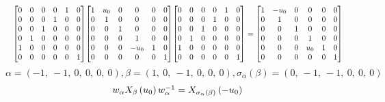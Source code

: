 \documentclass[11pt]{article}
\theoremstyle{definition}
\begin{document}
\[
\scaletoalign{\textwidth}{{\left[\begin{matrix}0 & 0 & 0 & 0 & 1 & 0\\0 & 0 & 0 & 1 & 0 & 0\\0 & 0 & 1 & 0 & 0 & 0\\0 & 1 & 0 & 0 & 0 & 0\\1 & 0 & 0 & 0 & 0 & 0\\0 & 0 & 0 & 0 & 0 & 1\end{matrix}\right]} {\left[\begin{matrix}1 & u_{0} & 0 & 0 & 0 & 0\\0 & 1 & 0 & 0 & 0 & 0\\0 & 0 & 1 & 0 & 0 & 0\\0 & 0 & 0 & 1 & 0 & 0\\0 & 0 & 0 & - u_{0} & 1 & 0\\0 & 0 & 0 & 0 & 0 & 1\end{matrix}\right]} {\left[\begin{matrix}0 & 0 & 0 & 0 & 1 & 0\\0 & 0 & 0 & 1 & 0 & 0\\0 & 0 & 1 & 0 & 0 & 0\\0 & 1 & 0 & 0 & 0 & 0\\1 & 0 & 0 & 0 & 0 & 0\\0 & 0 & 0 & 0 & 0 & 1\end{matrix}\right]} = {\left[\begin{matrix}1 & - u_{0} & 0 & 0 & 0 & 0\\0 & 1 & 0 & 0 & 0 & 0\\0 & 0 & 1 & 0 & 0 & 0\\0 & 0 & 0 & 1 & 0 & 0\\0 & 0 & 0 & u_{0} & 1 & 0\\0 & 0 & 0 & 0 & 0 & 1\end{matrix}\right]}}
\]
\[
\alpha = \left( -1, \  -1, \  0, \  0, \  0, \  0\right), \beta = \left( 1, \  0, \  -1, \  0, \  0, \  0\right), \sigma_{\alpha}(\beta) = \left( 0, \  -1, \  -1, \  0, \  0, \  0\right)
\]
\[
\scaletoalign{\textwidth}{w_{\alpha} X_{\beta}\left(u_{0}\right) w_{\alpha}^{-1} = X_{\sigma_{\alpha}\left(\beta\right)}\left(- u_{0}\right)}
\]
\end{document}

